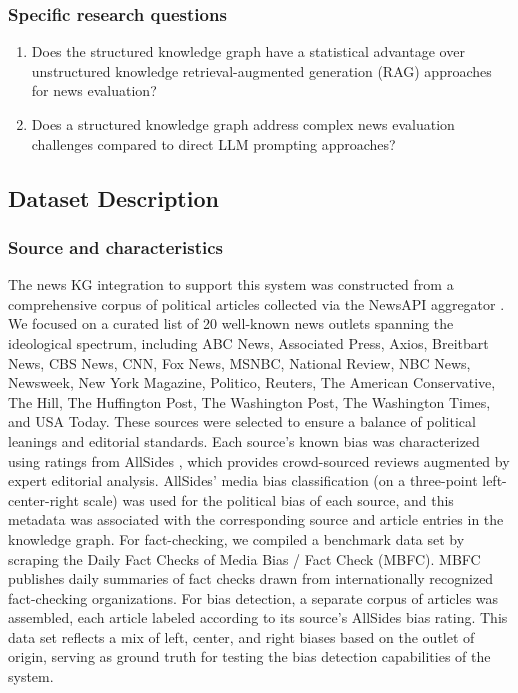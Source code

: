 \documentclass[11pt]{article}
\begin{document}
\subsubsection{Specific research questions}

\begin{enumerate}
    \item Does the structured knowledge graph have a statistical advantage over unstructured knowledge retrieval-augmented generation (RAG) approaches for news evaluation? 
    \item Does a structured knowledge graph address complex news evaluation challenges compared to direct LLM prompting approaches? 

\end{enumerate}


\subsection{Dataset Description}
\subsubsection{Source and characteristics}

The news KG integration to support this system was constructed from a comprehensive corpus of political articles collected via the NewsAPI aggregator \cite{r15}. We focused on a curated list of 20 well-known news outlets spanning the ideological spectrum, including ABC News, Associated Press, Axios, Breitbart News, CBS News, CNN, Fox News, MSNBC, National Review, NBC News, Newsweek, New York Magazine, Politico, Reuters, The American Conservative, The Hill, The Huffington Post, The Washington Post, The Washington Times, and USA Today. These sources were selected to ensure a balance of political leanings and editorial standards. Each source’s known bias was characterized using ratings from AllSides \cite{r16}, which provides crowd-sourced reviews augmented by expert editorial analysis. AllSides’ media bias classification (on a three-point left-center-right scale) was used for the political bias of each source, and this metadata was associated with the corresponding source and article entries in the knowledge graph.
For fact-checking, we compiled a benchmark data set by scraping the Daily Fact Checks of Media Bias / Fact Check (MBFC)\cite{r17}. MBFC publishes daily summaries of fact checks drawn from internationally recognized fact-checking organizations. 
For bias detection, a separate corpus of articles was assembled, each article labeled according to its source’s AllSides bias rating. This data set reflects a mix of left, center, and right biases based on the outlet of origin, serving as ground truth for testing the bias detection capabilities of the system. 
\end{document}
